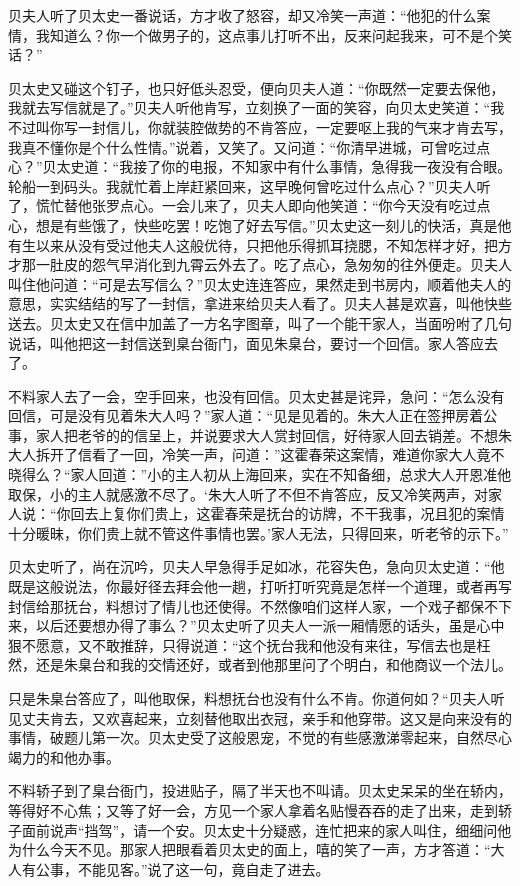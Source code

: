 \documentclass[12pt,UTF8]{ctexbook}
\begin{document}
{{{贝夫人听了贝太史一番说话，方才收了怒容，却又冷笑一声道：“他犯的什么案情，我知道么？你一个做男子的，这点事儿打听不出，反来问起我来，可不是个笑话？”

贝太史又碰这个钉子，也只好低头忍受，便向贝夫人道：“你既然一定要去保他，我就去写信就是了。”贝夫人听他肯写，立刻换了一面的笑容，向贝太史笑道：“我不过叫你写一封信儿，你就装腔做势的不肯答应，一定要呕上我的气来才肯去写，我真不懂你是个什么性情。”说着，又笑了。又问道：“你清早进城，可曾吃过点心？”贝太史道：“我接了你的电报，不知家中有什么事情，急得我一夜没有合眼。轮船一到码头。我就忙着上岸赶紧回来，这早晚何曾吃过什么点心？”贝夫人听了，慌忙替他张罗点心。一会儿来了，贝夫人即向他笑道：“你今天没有吃过点心，想是有些饿了，快些吃罢！吃饱了好去写信。”贝太史这一刻儿的快活，真是他有生以来从没有受过他夫人这般优待，只把他乐得抓耳挠腮，不知怎样才好，把方才那一肚皮的怨气早消化到九霄云外去了。吃了点心，急匆匆的往外便走。贝夫人叫住他问道：“可是去写信么？”贝太史连连答应，果然走到书房内，顺着他夫人的意思，实实结结的写了一封信，拿进来给贝夫人看了。贝夫人甚是欢喜，叫他快些送去。贝太史又在信中加盖了一方名字图章，叫了一个能干家人，当面吩咐了几句说话，叫他把这一封信送到臬台衙门，面见朱臬台，要讨一个回信。家人答应去了。

不料家人去了一会，空手回来，也没有回信。贝太史甚是诧异，急问：“怎么没有回信，可是没有见着朱大人吗？”家人道：“见是见着的。朱大人正在签押房着公事，家人把老爷的的信呈上，并说要求大人赏封回信，好待家人回去销差。不想朱大人拆开了信看了一回，冷笑一声，问道：”这霍春荣这案情，难道你家大人竟不晓得么？“家人回道：”小的主人初从上海回来，实在不知备细，总求大人开恩准他取保，小的主人就感激不尽了。‘朱大人听了不但不肯答应，反又冷笑两声，对家人说：“你回去上复你们贵上，这霍春荣是抚台的访牌，不干我事，况且犯的案情十分暖昧，你们贵上就不管这件事情也罢。’家人无法，只得回来，听老爷的示下。”

贝太史听了，尚在沉吟，贝夫人早急得手足如冰，花容失色，急向贝太史道：“他既是这般说法，你最好径去拜会他一趟，打听打听究竟是怎样一个道理，或者再写封信给那抚台，料想讨了情儿也还使得。不然像咱们这样人家，一个戏子都保不下来，以后还要想办得了事么？”贝太史听了贝夫人一派一厢情愿的话头，虽是心中狠不愿意，又不敢推辞，只得说道：“这个抚台我和他没有来往，写信去也是枉然，还是朱臬台和我的交情还好，或者到他那里问了个明白，和他商议一个法儿。

只是朱臬台答应了，叫他取保，料想抚台也没有什么不肯。你道何如？“贝夫人听见丈夫肯去，又欢喜起来，立刻替他取出衣冠，亲手和他穿带。这又是向来没有的事情，破题儿第一次。贝太史受了这般恩宠，不觉的有些感激涕零起来，自然尽心竭力的和他办事。

不料轿子到了臬台衙门，投进贴子，隔了半天也不叫请。贝太史呆呆的坐在轿内，等得好不心焦；又等了好一会，方见一个家人拿着名贴慢吞吞的走了出来，走到轿子面前说声“挡驾”，请一个安。贝太史十分疑惑，连忙把来的家人叫住，细细问他为什么今天不见。那家人把眼看着贝太史的面上，嘻的笑了一声，方才答道：“大人有公事，不能见客。”说了这一句，竟自走了进去。

}}}
\end{document}
